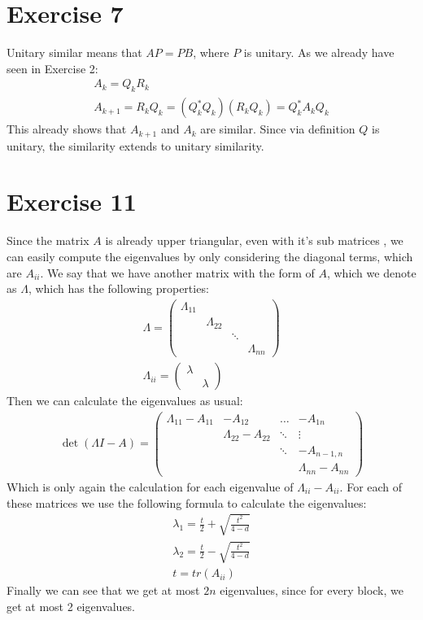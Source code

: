 \section{Exercise 7}
Unitary similar means that $AP = PB$, where $P$ is unitary.
As we already have seen in Exercise 2:
\begin{gather*}
A_k = Q_kR_k\\
A_{k+1} = R_kQ_k = ( Q_k^* Q_k ) (R_k Q_k) = Q^*_k A_k Q_k
\end{gather*}
This already shows that $A_{k+1}$ and $A_k$ are similar. Since via definition $Q$ is unitary, the similarity extends to unitary similarity.

\section{Exercise 11}
Since the matrix $A$ is already upper triangular, even with it's sub matrices , we can easily compute the eigenvalues by only considering the diagonal terms, which are $A_{ii}$.
We say that we have another matrix with the form of $A$, which we denote as $\Lambda$, which has the following properties:
\begin{gather*}
\Lambda = \left( \begin{array}{cccc}
\Lambda_{11} & & & \\
 & \Lambda_{22} & & \\
 & & \ddots & \\
 & & & \Lambda_{nn}
\end{array} \right)\\
\Lambda_{ii} = \left( \begin{array}{cc}
\lambda & \\
& \lambda
\end{array} \right)
\end{gather*}
Then we can calculate the eigenvalues as usual:
\begin{gather*}
\det(\Lambda I - A) = \left( \begin{array}{cccc}
\Lambda_{11} -A_{11} & -A_{12} & \hdots & -A_{1n} \\
 & \Lambda_{22} -A_{22}  & \ddots& \vdots \\
 & & \ddots & - A_{n-1,n} \\
 & & &  \Lambda_{nn} - A_{nn}
\end{array} \right)
\end{gather*}
Which is only again the calculation for each eigenvalue of $\Lambda_{ii} - A_{ii}$.
For each of these matrices we use the following formula to calculate the eigenvalues:
\begin{gather*}
\lambda_1 = \frac{t}{2} + \sqrt{\frac{t^2}{4-d}}\\
\lambda_2 = \frac{t}{2} - \sqrt{\frac{t^2}{4-d}}\\
t = tr(A_{ii})
\end{gather*}
Finally we can see that we get at most $2n$ eigenvalues, since for every block, we get at most 2 eigenvalues.
